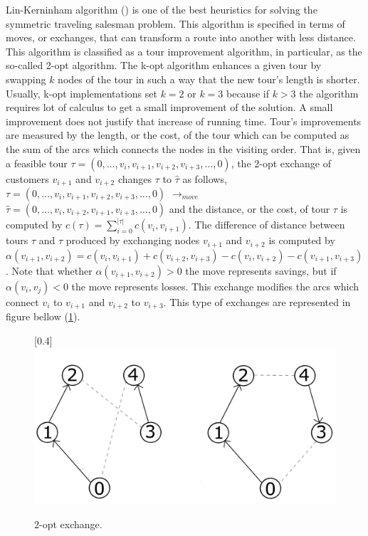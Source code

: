 Lin-Kerninham algorithm (\cite{L-K}) is one of the best heuristics for solving the symmetric traveling salesman problem. This algorithm is specified in terms of moves, or exchanges, that can transform a route into another with less distance. This algorithm is classified as a tour improvement algorithm, in particular, as the so-called 2-opt algorithm. The k-opt algorithm enhances a given tour by swapping $k$ nodes of the tour in such a way that the new tour's length is shorter. Usually, k-opt implementations set $k = 2$ or $k = 3$ because if $k>3$ the algorithm requires lot of calculus to get a small improvement of the solution. A small improvement does not justify that increase of running time. Tour's improvements are measured by the length, or the cost, of the tour which can be computed as the sum of the arcs which connects the nodes in the visiting order. That is, given a feasible tour $\tau=(0,\dots,v_{i}, v_{i+1}, v_{i+2}, v_{i+3},\dots,0)$,
the 2-opt exchange of customers $v_{i+1}$ and $v_{i+2}$ changes $\tau$ to $\hat{\tau}$ as follows, $ \tau =(0,\dots,v_{i}, v_{i+1}, v_{i+2}, v_{i+3},\dots,0)$   $\rightarrow_{move}$  
$\hat{\tau}=(0,\dots,v_{i}, v_{i+2}, v_{i+1}, v_{i+3},\dots,0)$ and the distance, or the cost, of tour $\tau$ is computed by $c(\tau) = \sum_{i = 0}^{|\tau| } c(v_{i}, v_{i+1})$.  The difference of distance between tours $\tau$ and $\hat{\tau}$ produced by exchanging nodes $v_{i+1}$ and $v_{i+2}$ is computed by $\alpha(v_{i+1},v_{i+2}) = c(v_{i},v_{i+1}) + c(v_{i+2},v_{i+3} ) - c(v_{i},v_{i+2} )- c(v_{i+1},v_{i+3})$. Note that whether $\alpha(v_{i+1},v_{i+2})>0$ the move represents savings, but if $\alpha(v_{i},v_{j})<0$ the move represents losses. This exchange modifies the arcs which connect $v_{i}$ to $ v_{i+1} $ and $ v_{i+2}$ to $v_{i+3}$. This type of exchanges are represented in figure bellow (\ref{move1}).

\begin{figure}[H]
	\centering
	\scalebox{0.4}[0.4]{
		\includegraphics[width=\linewidth]{./img/lk1y2.jpg}
	}
	\caption{2-opt exchange.}
	\label{move1}
\end{figure}\

